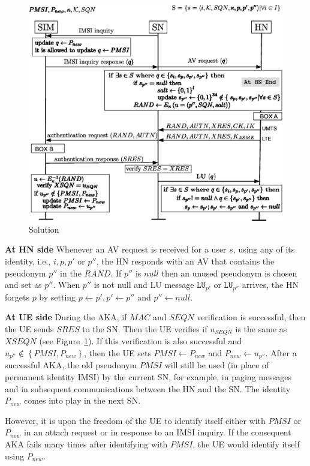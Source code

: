\documentclass{llncs} %
\begin{document}
\begin{figure}[]
  \centering
    \includegraphics[scale = .38,clip = true, trim = 0cm 0cm 0cm 0cm]{solution.eps}
  \caption{Solution}
  \label{fig:solution}	
\end{figure}

\textbf{At HN side } Whenever an AV request is received for a user $s$, using any of its identity, i.e., $i,p,p'$ or $p''$, the HN responds with an AV that contains the pseudonym $p''$ in the $RAND$. If $p''$ is $null$ then an unused pseudonym is chosen and set as $p''$. When $p''$ is not null and LU message $\texttt{LU}_{p'}$ or $\texttt{LU}_{p''}$ arrives, the HN forgets $p$ by setting $p \leftarrow p', p' \leftarrow p''$ and $p'' \leftarrow null$. 

\textbf{At UE side } During the AKA, if $MAC$ and $SEQN$ verification is successful, then the UE sends $SRES$ to the SN. Then the UE verifies if $u_{SEQN}$ is the same as $XSEQN$ (see Figure~\ref{fig:solution}). If this verification is also successful and $u_{p''} \notin \left\lbrace PMSI,P_{new} \right\rbrace$, then the UE sets $PMSI \leftarrow P_{new}$ and $P_{new} \leftarrow u_{p''}$. After a successful AKA, the old pseudonym $PMSI$ will still be used (in place of permanent identity IMSI) by the current SN, for example, in paging messages and in subsequent communications between the HN and the SN. The identity $P_{new}$ comes into play in the next SN. 

However, it is upon the freedom of the UE to identify itself either with $PMSI$ or $P_{new}$ in an attach request or in response to an IMSI inquiry. If the consequent AKA fails many times after identifying with $PMSI$, the UE would identify itself using $P_{new}$.
\end{document}
